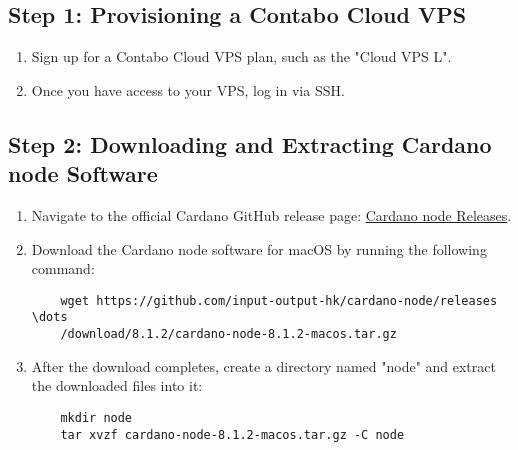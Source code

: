 \subsection{Step 1: Provisioning a Contabo Cloud VPS}
\begin{enumerate}
    \item Sign up for a Contabo Cloud VPS plan, such as the "Cloud VPS L".
    \item Once you have access to your VPS, log in via SSH.
\end{enumerate}

\subsection{Step 2: Downloading and Extracting Cardano node Software}
\begin{enumerate}
    \item Navigate to the official Cardano GitHub release page: \href{https://github.com/input-output-hk/cardano-node/releases/tag/8.1.2}{Cardano node Releases}.
    \item Download the Cardano node software for macOS by running the following command:
    \begin{verbatim}
    wget https://github.com/input-output-hk/cardano-node/releases \dots
    /download/8.1.2/cardano-node-8.1.2-macos.tar.gz
    \end{verbatim}
    \item After the download completes, create a directory named "node" and extract the downloaded files into it:
    \begin{verbatim}
    mkdir node
    tar xvzf cardano-node-8.1.2-macos.tar.gz -C node
    \end{verbatim}
\end{enumerate}

